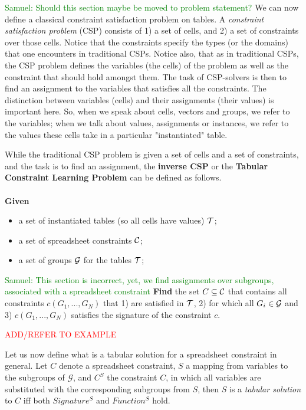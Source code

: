 \documentclass{ecai}
\newcommand{\samuel}[1]{\textcolor{green}{{\sc Samuel:} #1}\xspace}
\newcommand{\CSignature}{Signature\xspace}
\newcommand{\CFunction}{Function\xspace}
\newcommand{\groups}{\ensuremath{\mathcal{G}}\xspace}
\newcommand{\luc}[1]{{\textcolor{red}{#1}}}
\begin{document}
\samuel{Should this section maybe be moved to problem statement?}
We can now define a classical constraint satisfaction problem on tables.
A {\em constraint satisfaction problem} (CSP)  consists of 1) a set of cells, and 2) a set of constraints over those cells.
Notice that the constraints specify the types (or the domains) that one encounters in traditional CSPs.
Notice also, that as in traditional CSPs, the CSP problem defines the variables (the cells) of the problem as well as the constraint that should hold amongst them. The task of CSP-solvers is then to find an assignment to the variables that satisfies all the constraints.
The distinction between variables (cells) and their assignments (their values) is important here.
So, when we speak about cells, vectors and groups, we refer to the variables; when we talk about values, assignments or instances, we refer to the values these cells take in a particular "instantiated" table.

While the traditional CSP problem is given a set of cells and a set of constraints,
and the task is to find an assignment, the {\bf inverse CSP} or the {\bf Tabular Constraint Learning Problem} can be defined as follows.\\
\\
{\bf Given }
\begin{itemize}
\item
a set of instantiated tables (so all cells have values) ${\cal T}$;
\item
a set of spreadsheet constraints ${\cal C}$;
\item
a set of groups ${\cal G}$ for the tables ${\cal T}$;
\end{itemize}
\noindent
\samuel{This section is incorrect, yet, we find assignments over subgroups, associated with a spreadsheet constraint}
{\bf Find}  the set $C\subseteq {\cal C}$ that contains all constraints $c(G_1, ... , G_N)$ that 1) are satisfied  in ${\cal T}$, 2)
for which
all $G_i \in {\cal G}$ and  3)  $c(G_1, ... , G_N)$ satisfies the signature of the constraint $c$.


\luc{ADD/REFER TO EXAMPLE}

Let us now define what is a tabular solution for a spreadsheet constraint in general. Let $C$ denote a spreadsheet constraint, $S$ a mapping from variables to the subgroups of \groups, and $C^S$ the constraint $C$, in which all variables are substituted with the corresponding subgroups from $S$, then $S$ is a \textit{tabular solution} to $C$ iff both $\CSignature^S$ and $\CFunction^S$ hold.
\end{document}
